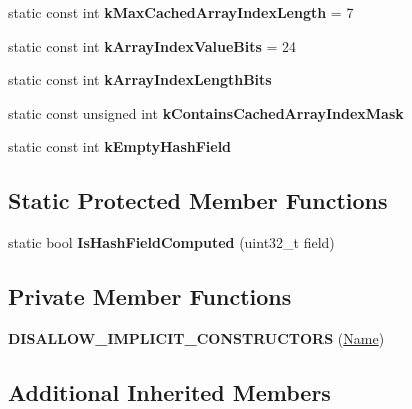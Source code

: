 \begin{DoxyCompactItemize}
\item 
static const int {\bfseries k\+Max\+Cached\+Array\+Index\+Length} = 7\hypertarget{classv8_1_1internal_1_1_name_a29a07cb2ebdab579a278a6891edfdcae}{}\label{classv8_1_1internal_1_1_name_a29a07cb2ebdab579a278a6891edfdcae}

\item 
static const int {\bfseries k\+Array\+Index\+Value\+Bits} = 24\hypertarget{classv8_1_1internal_1_1_name_ac253c758f54e8ac0708b4b647ebbe9f8}{}\label{classv8_1_1internal_1_1_name_ac253c758f54e8ac0708b4b647ebbe9f8}

\item 
static const int {\bfseries k\+Array\+Index\+Length\+Bits}
\item 
static const unsigned int {\bfseries k\+Contains\+Cached\+Array\+Index\+Mask}
\item 
static const int {\bfseries k\+Empty\+Hash\+Field}
\end{DoxyCompactItemize}
\subsection*{Static Protected Member Functions}
\begin{DoxyCompactItemize}
\item 
static bool {\bfseries Is\+Hash\+Field\+Computed} (uint32\+\_\+t field)\hypertarget{classv8_1_1internal_1_1_name_a9b9b29b11d96f3345cbee8f6e5b45465}{}\label{classv8_1_1internal_1_1_name_a9b9b29b11d96f3345cbee8f6e5b45465}

\end{DoxyCompactItemize}
\subsection*{Private Member Functions}
\begin{DoxyCompactItemize}
\item 
{\bfseries D\+I\+S\+A\+L\+L\+O\+W\+\_\+\+I\+M\+P\+L\+I\+C\+I\+T\+\_\+\+C\+O\+N\+S\+T\+R\+U\+C\+T\+O\+RS} (\hyperlink{classv8_1_1internal_1_1_name}{Name})\hypertarget{classv8_1_1internal_1_1_name_a4df65144e4234dd62861fbefa5e25a85}{}\label{classv8_1_1internal_1_1_name_a4df65144e4234dd62861fbefa5e25a85}

\end{DoxyCompactItemize}
\subsection*{Additional Inherited Members}


